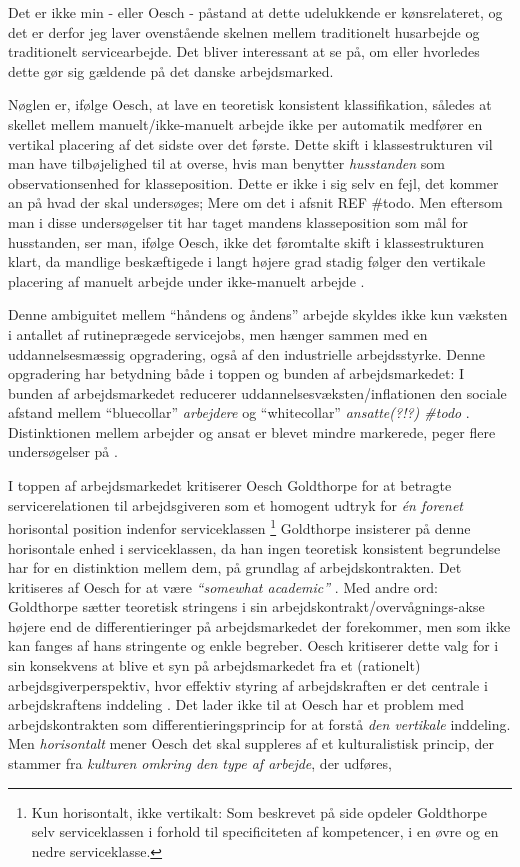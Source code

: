 Det er ikke min - eller Oesch - påstand at dette udelukkende er kønsrelateret, og det er derfor jeg laver ovenstående skelnen mellem  traditionelt husarbejde og traditionelt servicearbejde. Det bliver interessant at se på, om eller hvorledes dette gør sig gældende på det danske arbejdsmarked. 

Nøglen er, ifølge Oesch, at lave en teoretisk konsistent klassifikation, således at skellet mellem manuelt/ikke-manuelt arbejde ikke per automatik medfører en vertikal placering af det sidste over det første. Dette skift i klassestrukturen vil man have tilbøjelighed til at overse, hvis man benytter \emph{husstanden} som observationsenhed for klasseposition. Dette er ikke i sig selv en fejl, det kommer an på hvad der skal undersøges; Mere om det i afsnit REF \#todo. Men eftersom man i disse undersøgelser tit har taget mandens klasseposition som mål for husstanden, ser man, ifølge Oesch, ikke det føromtalte skift i klassestrukturen klart, da mandlige beskæftigede i langt højere grad stadig følger den vertikale placering af manuelt arbejde under ikke-manuelt arbejde \parencite[42]{Oesch2006a}.

Denne ambiguitet mellem “håndens og åndens” arbejde skyldes ikke kun væksten i antallet af rutineprægede servicejobs, men hænger sammen med en uddannelsesmæssig opgradering, også af den industrielle arbejdsstyrke. Denne opgradering har betydning både i toppen og bunden af arbejdsmarkedet: I bunden af arbejdsmarkedet
reducerer uddannelsesvæksten/inflationen den sociale afstand mellem “bluecollar” \emph{arbejdere} og “whitecollar” \emph{ansatte(?!?) \#todo} . Distinktionen mellem arbejder og ansat er blevet mindre markerede, peger flere undersøgelser på \parencite[49]{Oesch2006a}. 

I toppen af arbejdsmarkedet kritiserer Oesch Goldthorpe for at betragte servicerelationen til arbejdsgiveren som et homogent udtryk for \emph{én forenet} horisontal position indenfor serviceklassen%
%
\footnote{ Kun horisontalt, ikke vertikalt: Som beskrevet på side \pageref{klasse egp11} opdeler Goldthorpe selv serviceklassen i forhold til specificiteten af kompetencer, i en øvre og en nedre serviceklasse.}%
Goldthorpe insisterer på denne horisontale enhed i serviceklassen, da han ingen teoretisk konsistent begrundelse har for en distinktion mellem dem, på grundlag af arbejdskontrakten. Det kritiseres af Oesch for at være \emph{“somewhat academic”} \parencite[53]{Oesch2006a}. Med andre ord: Goldthorpe sætter teoretisk stringens i sin arbejdskontrakt/overvågnings-akse højere end de differentieringer på arbejdsmarkedet der forekommer, men som ikke kan fanges af hans stringente og enkle begreber. Oesch kritiserer dette valg for i sin konsekvens at blive et syn på arbejdsmarkedet fra et (rationelt) arbejdsgiverperspektiv, hvor effektiv styring af arbejdskraften er det centrale i arbejdskraftens inddeling \parencite[53]{Oesch2006a}. Det lader ikke til at Oesch har et problem med arbejdskontrakten som differentieringsprincip for at forstå \emph{den vertikale} inddeling. Men \emph{horisontalt} mener Oesch det skal suppleres af et kulturalistisk princip, der stammer fra \emph{kulturen omkring den type af arbejde}, der udføres,

